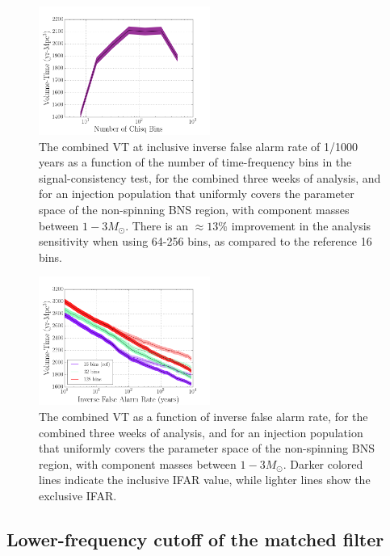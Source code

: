 \begin{figure}
\centering
\includegraphics[width=0.5\textwidth]{papers/bns_o1_dev/figures/cb.png}
\caption{\label{fig:vbin} 
The combined VT at inclusive inverse false alarm rate of 1/1000 years as a function of the number of time-frequency bins in the signal-consistency test, for the combined three weeks of analysis, and for an injection population that uniformly covers the parameter space of the non-spinning BNS region, with component masses between $1- 3M_\odot$. There is an $\approx 13\% $ improvement in the analysis sensitivity when using 64-256 bins, as compared to the reference 16 bins.
}
\end{figure}

\begin{figure}
\centering
\includegraphics[width=0.5\textwidth]{papers/bns_o1_dev/figures/chisq_combined.png}
\caption{\label{fig:fchisq} 
The combined VT as a function of inverse false alarm rate, for the combined three weeks of analysis, and for an injection population that uniformly covers the parameter space of the non-spinning BNS region, with component masses between $1- 3M_\odot$. Darker colored lines indicate the inclusive IFAR value, while lighter lines show the exclusive IFAR. 
}
\end{figure}

\subsection{Lower-frequency cutoff of the matched filter}

